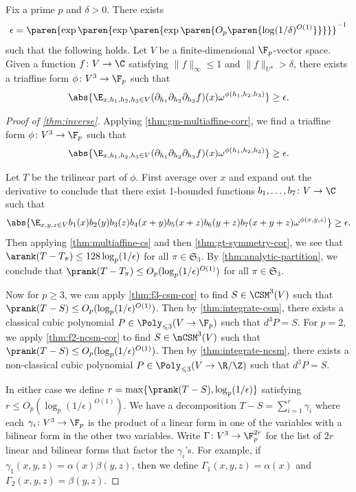 \begin{thm}[{\cite{GM17}}]
\label{thm:gm-multiaffine-corr}
Fix a prime $p$ and $\delta>0$. There exists \[\epsilon=\paren{\exp\paren{\exp\paren{\exp\paren{O_p\paren{\log(1/\delta)^{O(1)}}}}}}^{-1}\]
such that the following holds. Let $V$ be a finite-dimensional $\F_p$-vector space. Given a function $f\colon V\to\C$ satisfying $\|f\|_\infty\leq1$ and $\|f\|_{U^{4}}>\delta$, there exists a triaffine form $\phi\colon V^3\to\F_p$ such that
\begin{equation}
\label{eq:tri-affine-cor}
\abs{\E_{x,h_1,h_2,h_3\in V}(\partial_{h_1}\partial_{h_2}\partial_{h_3}f)(x)\omega^{\phi(h_1,h_2,h_3)}}\geq\epsilon.
\end{equation}
\end{thm}

\begin{proof}[Proof of \cref{thm:inverse}]
Applying \cref{thm:gm-multiaffine-corr}, we find a triaffine form $\phi\colon V^3\to\F_p$ such that
\[\abs{\E_{x,h_1,h_2,h_3\in V}(\partial_{h_1}\partial_{h_2}\partial_{h_3}f)(x)\omega^{\phi(h_1,h_2,h_3)}}\geq\epsilon.\]

Let $T$ be the trilinear part of $\phi$. First average over $x$ and expand out the derivative to conclude that there exist 1-bounded functions $b_1,\ldots,b_7\colon V\to\C$ such that
\[\abs{\E_{x,y,z\in V}b_1(x)b_2(y)b_3(z)b_4(x+y)b_5(x+z)b_6(y+z)b_7(x+y+z)\omega^{\phi(x,y,z)}}\geq\epsilon.\]
Then applying \cref{thm:multiaffine-cs} and then \cref{thm:gt-symmetry-cor}, we see that $\arank(T-T_\pi)\leq 128\log_p(1/\epsilon)$ for all $\pi\in\mathfrak S_3$. By \cref{thm:analytic-partition}, we conclude that $\prank(T-T_\pi)\leq O_p(\log_p(1/\epsilon)^{O(1)})$ for all $\pi\in\mathfrak S_3$.

Now for $p\geq 3$, we can apply \cref{thm:f3-csm-cor} to find $S\in\CSM^3(V)$ such that $\prank(T-S)\leq O_p(\log_p(1/\epsilon)^{O(1)})$. Then by \cref{thm:integrate-csm}, there exists a classical cubic polynomial $P\in\Poly_{\leqslant 3}(V\to\F_p)$ such that $d^3P=S$. For $p=2$, we apply \cref{thm:f2-ncsm-cor} to find $S\in\nCSM^3(V)$ such that $\prank(T-S)\leq O_p(\log_p(1/\epsilon)^{O(1)})$. Then by \cref{thm:integrate-ncsm}, there exists a non-classical cubic polynomial $P\in\Poly_{\leqslant 3}(V\to\R/\Z)$ such that $d^3P=S$.

In either case we define $r=\max\{\prank(T-S),\log_p(1/\epsilon)\}$ satisfying $r\leq O_p(\log_p(1/\epsilon)^{O(1)})$. We have a decomposition $T-S=\sum_{i=1}^r\gamma_i$ where each $\gamma_i\colon V^3\to\F_p$ is the product of a linear form in one of the variables with a bilinear form in the other two variables. Write $\Gamma\colon V^3\to\F_p^{2r}$ for the list of $2r$ linear and bilinear forms that factor the $\gamma_i$'s. For example, if $\gamma_1(x,y,z)=\alpha(x)\beta(y,z)$, then we define $\Gamma_1(x,y,z)=\alpha(x)$ and $\Gamma_2(x,y,z)=\beta(y,z)$.


\end{proof}

